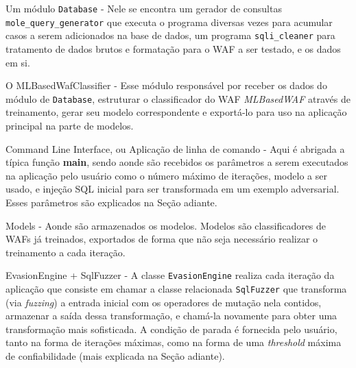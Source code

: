 \begin{alineas}
\item Um módulo \verb+Database+ - Nele se encontra um gerador de consultas \verb+mole_query_generator+ que executa o programa diversas vezes para acumular casos a serem adicionados na base de dados, um programa \verb+sqli_cleaner+ para tratamento de dados brutos e formatação para o WAF a ser testado, e os dados em si.

\item O MLBasedWafClassifier - Esse módulo responsável por receber os dados do módulo de \verb+Database+, estruturar o classificador do WAF \textit{MLBasedWAF} através de treinamento, gerar seu modelo correspondente e exportá-lo para uso na aplicação principal na parte de modelos.

\item Command Line Interface, ou Aplicação de linha de comando - Aqui é abrigada a típica função \textbf{main}, sendo aonde são recebidos os parâmetros a serem executados na aplicação pelo usuário como o número máximo de iterações, modelo a ser usado, e injeção SQL inicial para ser transformada em um exemplo adversarial. Esses parâmetros são explicados na Seção adiante.

\item Models - Aonde são armazenados os modelos. Modelos são classificadores de WAFs já treinados, exportados de forma que não seja necessário realizar o treinamento a cada iteração. 

\item EvasionEngine + SqlFuzzer - A classe \verb+EvasionEngine+ realiza cada iteração da aplicação que consiste em chamar a classe relacionada \verb+SqlFuzzer+ que transforma (via \textit{fuzzing}) a entrada inicial com os operadores de mutação nela contidos, armazenar a saída dessa transformação, e chamá-la novamente para obter uma transformação mais sofisticada. A condição de parada é fornecida pelo usuário, tanto na forma de iterações máximas, como na forma de uma \textit{threshold} máxima de confiabilidade (mais explicada na Seção adiante).

\end{alineas}

